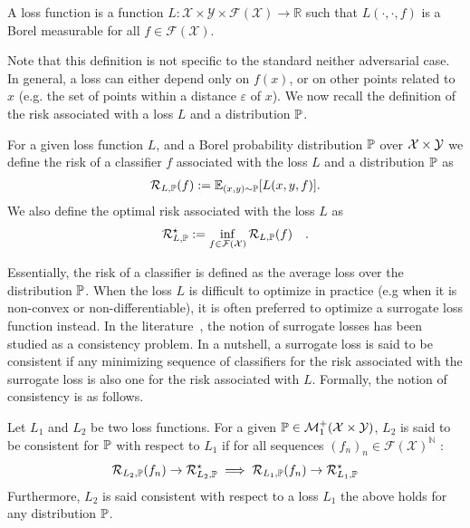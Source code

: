 \begin{definition} A loss function is a function $L:\mathcal{X}\times\mathcal{Y}\times \mathcal{F}(\mathcal{X})\to \mathbb{R}$ such that $L(\cdot,\cdot,f)$ is a Borel measurable for all $f\in\mathcal{F}(\mathcal{X})$. 
\end{definition}
Note that this definition is not specific to the standard neither adversarial case. In general, a loss can either depend only on $f(x)$, or on other points related to $x$ (e.g. the set of points within a distance $\varepsilon$ of $x$). We now recall the definition of the risk associated with a loss $L$ and a distribution $\mathbb{P}$. 
\begin{definition}
For a given loss function $L$, and a Borel probability distribution $\mathbb{P}$ over $\mathcal{X}\times\mathcal{Y}$ we define the risk of a classifier $f$ associated with the loss $L$ and a distribution $\mathbb{P}$ as
\begin{align*}
     \risk_{L,\PP}(f) := \mathbb{E}_{(x,y)\sim\PP}\left[L(x,y,f)\right].
\end{align*}
We also define the optimal risk associated with the loss $L$ as
\begin{align*}
         \mathcal{R}_{L,\mathbb{P}}^\star := \inf_{f\in\mathcal{F}(\mathcal{X})}\mathcal{R}_{L,\mathbb{P}}(f)\quad.
\end{align*}
\end{definition}

Essentially, the risk of a classifier is defined as the average loss over the distribution $\mathbb{P}$. When the loss $L$ is difficult to optimize in practice (e.g when it is non-convex or non-differentiable),  it is often preferred to optimize a surrogate loss function instead. In the literature~\citep{zhang2004statistical,bartlett2006convexity,steinwart2007compare}, the notion of surrogate losses has been studied as a consistency problem. In a nutshell, a surrogate loss is said to be consistent if any minimizing sequence of classifiers for the risk associated with the surrogate loss is also one for the risk associated with $L$. Formally, the notion of consistency is as  follows.

\begin{definition}[Consistency]
Let $L_1$ and $L_2$ be two loss functions. For a given $\mathbb{P}\in\mathcal{M}_1^+(\mathcal{X}\times\mathcal{Y})$, $L_2$ is said to be consistent for $\mathbb{P}$ with respect to $L_1$ if for all sequences $(f_n)_n \in \mathcal{F}(\mathcal{X})^\mathbb{N}$ :
\begin{align}
    \mathcal{R}_{L_2,\mathbb{P}}(f_n)\to \mathcal{R}_{L_2,\mathbb{P}}^\star\implies\mathcal{R}_{L_1,\mathbb{P}}(f_n)\to \mathcal{R}_{L_1,\mathbb{P}}^\star
\end{align}
Furthermore, $L_2$ is said consistent with respect to a loss $L_1$ the above holds for any distribution $\mathbb{P}$.
\end{definition}

